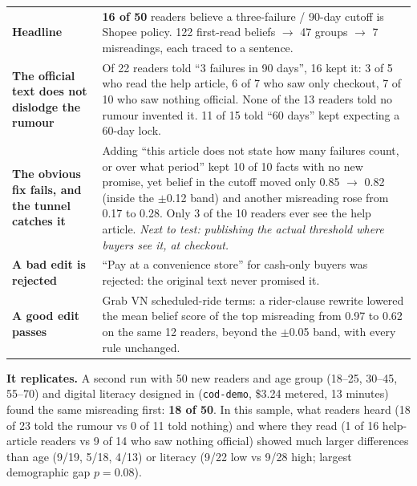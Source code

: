 \documentclass[11pt,a4paper]{article}
\newcommand{\code}[1]{\texttt{#1}}
\newcommand{\hl}[1]{\textcolor{amber}{\textbf{#1}}}
\begin{document}
\begin{tabularx}{\linewidth}{@{}>{\raggedright\arraybackslash}p{4.3cm}X@{}}
\toprule
\textbf{Headline} & \hl{16 of 50} readers believe a three-failure / 90-day cutoff is Shopee policy. 122 first-read beliefs $\to$ 47 groups $\to$ 7 misreadings, each traced to a sentence. \\
\textbf{The official text does not dislodge the rumour} & Of 22 readers told ``3 failures in 90 days'', 16 kept it: 3 of 5 who read the help article, 6 of 7 who saw only checkout, 7 of 10 who saw nothing official. None of the 13 readers told no rumour invented it. 11 of 15 told ``60 days'' kept expecting a 60-day lock. \\
\textbf{The obvious fix fails, and the tunnel catches it} & Adding ``this article does not state how many failures count, or over what period'' kept 10 of 10 facts with no new promise, yet belief in the cutoff moved only 0.85 $\to$ 0.82 (inside the $\pm$0.12 band) and another misreading rose from 0.17 to 0.28. Only 3 of the 10 readers ever see the help article. \emph{Next to test: publishing the actual threshold where buyers see it, at checkout.} \\
\textbf{A bad edit is rejected} & ``Pay at a convenience store'' for cash-only buyers was rejected: the original text never promised it. \\
\textbf{A good edit passes} & Grab VN scheduled-ride terms: a rider-clause rewrite lowered the mean belief score of the top misreading from 0.97 to 0.62 on the same 12 readers, beyond the $\pm$0.05 band, with every rule unchanged. \\
\bottomrule
\end{tabularx}

\vspace{0.6ex}\noindent\textbf{It replicates.} A second run with 50 new readers and age group (18--25, 30--45, 55--70) and digital literacy designed in (\code{cod-demo}, \$3.24 metered, 13 minutes) found the same misreading first: \hl{18 of 50}. In this sample, what readers heard (18 of 23 told the rumour vs 0 of 11 told nothing) and where they read (1 of 16 help-article readers vs 9 of 14 who saw nothing official) showed much larger differences than age (9/19, 5/18, 4/13) or literacy (9/22 low vs 9/28 high; largest demographic gap $p=0.08$).
\end{document}
